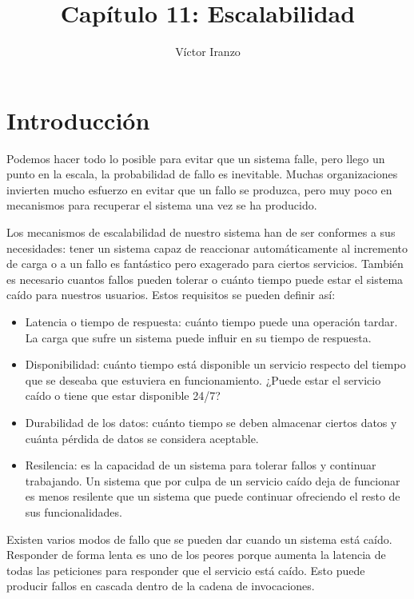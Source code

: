 \documentclass[11pt,a4paper]{article}
\author{Víctor Iranzo}
\title{Capítulo 11: Escalabilidad}
\begin{document}
\maketitle

\section{Introducción}

Podemos hacer todo lo posible para evitar que un sistema falle, pero llego un punto en la escala, la probabilidad de fallo es inevitable. Muchas organizaciones invierten mucho esfuerzo en evitar que un fallo se produzca, pero muy poco en mecanismos para recuperar el sistema una vez se ha producido.

Los mecanismos de escalabilidad de nuestro sistema han de ser conformes a sus necesidades: tener un sistema capaz de reaccionar automáticamente al incremento de carga o a un fallo es fantástico pero exagerado para ciertos servicios. También es necesario cuantos fallos pueden tolerar o cuánto tiempo puede estar el sistema caído para nuestros usuarios. Estos requisitos se pueden definir así:

\begin{itemize}

\item Latencia o tiempo de respuesta: cuánto tiempo puede una operación tardar. La carga que sufre un sistema puede influir en su tiempo de respuesta.

\item Disponibilidad: cuánto tiempo está disponible un servicio respecto del tiempo que se deseaba que estuviera en funcionamiento. ¿Puede estar el servicio caído o tiene que estar disponible 24/7?

\item Durabilidad de los datos: cuánto tiempo se deben almacenar ciertos datos y cuánta pérdida de datos se considera aceptable.

\item Resilencia: es la capacidad de un sistema para tolerar fallos y continuar trabajando. Un sistema que por culpa de un servicio caído deja de funcionar es menos resilente que un sistema que puede continuar ofreciendo el resto de sus funcionalidades.

\end{itemize}

Existen varios modos de fallo que se pueden dar cuando un sistema está caído. Responder de forma lenta es uno de los peores porque aumenta la latencia de todas las peticiones para responder que el servicio está caído. Esto puede producir fallos en cascada dentro de la cadena de invocaciones.
\end{document}
